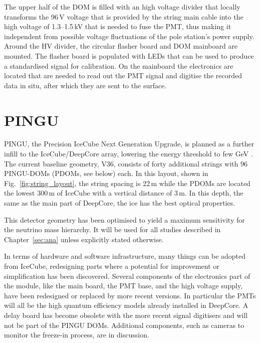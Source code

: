 The upper half of the DOM is filled with an high voltage divider that locally 
transforms the 96\,V voltage that is provided by the string main cable into the 
high voltage of 1.3--1.5\,kV that is needed to fuse the PMT, thus making it 
independent from possible voltage fluctuations of the pole station's power 
supply. Around the HV divider, the circular flasher board and DOM mainboard are 
mounted. The flasher board is populated with LEDs that can be used to produce a 
standardised signal for calibration. On the mainboard the electronics are 
located that are needed to read out the PMT signal and digitise the recorded 
data in situ, after which they are sent to the surface.



\section{PINGU}
\label{sec:PINGU}

PINGU, the Precision IceCube Next Generation Upgrade, is planned as a further 
infill to the IceCube/DeepCore array, lowering the energy threshold to few GeV 
\cite{LoI}. The current baseline geometry, V36, consists of forty additional 
strings with 96 PINGU-DOMs (PDOMs, see below) each. In this layout, shown in
Fig.~\ref{fig:string_layout}, the string spacing is 22\,m while the PDOMs are
located the lowest 300\,m of IceCube with a vertical distance of 3\,m. In this
depth, the same as the main part of DeepCore, the ice has the best optical 
properties.

This detector geometry has been optimised to yield a maximum sensitivity for 
the neutrino mass hierarchy. It will be used for all studies described in 
Chapter~\ref{sec:ana} unless explicitly stated otherwise.

In terms of hardware and software infrastructure, many things can be adopted 
from IceCube, redesigning parts where a potential for improvement or 
simplification has been discovered. Several components of the electronics part
of the module, like the main board, the PMT base, and the high voltage supply,
have been redesigned or replaced by more recent versions. In particular the PMTs
will all be the high quantum efficiency models already installed in DeepCore.
A delay board has become obsolete with the more recent signal digitisers and
will not be part of the PINGU DOMs. Additional components, such as cameras to
monitor the freeze-in process, are in discussion.

